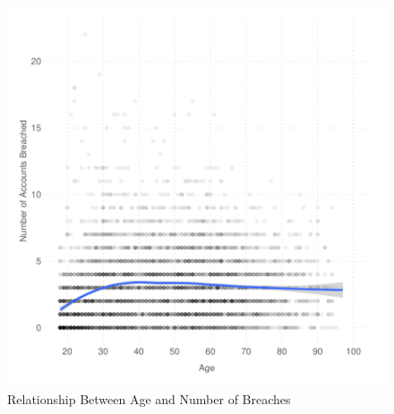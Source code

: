 \documentclass[sigconf]{acmart}
\begin{document}
\begin{figure}[H]
  \centering
   \caption{Relationship Between Age and Number of Breaches  
  \label{fig:age_breaches}}
    \includegraphics[scale=.75]{../figs/age_pwned.pdf}
\end{figure}
\end{document}
